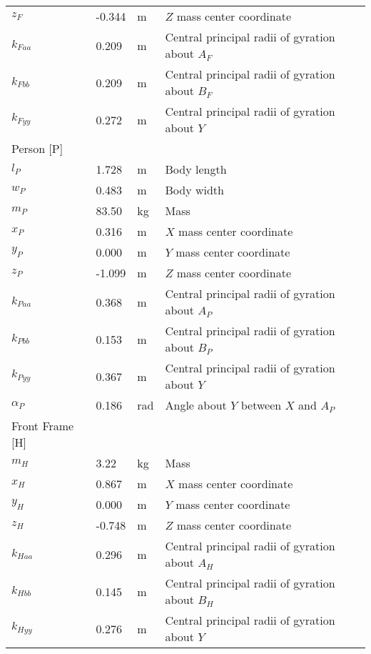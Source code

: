 \documentclass{bmd2019p}
\begin{document}
\begin{table}
\begin{tabular}{llll}
    $z_F$     & -0.344 & \si{\meter} & $Z$ mass center coordinate \\
    $k_{Faa}$ &  0.209 & \si{\meter} & Central principal radii of gyration about $A_F$ \\
    $k_{Fbb}$ &  0.209 & \si{\meter} & Central principal radii of gyration about $B_F$ \\
    $k_{Fyy}$ &  0.272 & \si{\meter} & Central principal radii of gyration about $Y$ \\
    Person [P] & & \\
    \midrule
    $l_P$      &  1.728   & \si{\meter} & Body length \\
    $w_P$      &  0.483   & \si{\meter} & Body width \\
    $m_P$      &  83.50    & \si{\kilogram} & Mass \\
    $x_P$      &  0.316 & \si{\meter} & $X$ mass center coordinate \\
    $y_P$      & 0.000      & \si{\meter} & $Y$ mass center coordinate \\
    $z_P$      & -1.099  & \si{\meter} & $Z$ mass center coordinate \\
    $k_{Paa}$  &  0.368 & \si{\meter} & Central principal radii of gyration about $A_P$ \\
    $k_{Pbb}$  &  0.153 & \si{\meter} & Central principal radii of gyration about $B_P$ \\
    $k_{Pyy}$  &  0.367 & \si{\meter} & Central principal radii of gyration about $Y$ \\
    $\alpha_P$ & 0.186 & \si{\radian} & Angle about $Y$ between $X$ and $A_P$ \\
    Front Frame [H] & & \\
    \midrule
    $m_H$ & 3.22 & \si{\kilogram}     & Mass \\
    $x_H$ & 0.867 & \si{\meter}       & $X$ mass center coordinate \\
    $y_H$ & 0.000 & \si{\meter}           & $Y$ mass center coordinate \\
    $z_H$ & -0.748 & \si{\meter}      & $Z$ mass center coordinate \\
    $k_{Haa}$ & 0.296 & \si{\meter}   & Central principal radii of gyration about $A_H$ \\
    $k_{Hbb}$ & 0.145 & \si{\meter}   & Central principal radii of gyration about $B_H$ \\
    $k_{Hyy}$ & 0.276 & \si{\meter}   & Central principal radii of gyration about $Y$ \\

\end{tabular}
\end{table}
\end{document}

